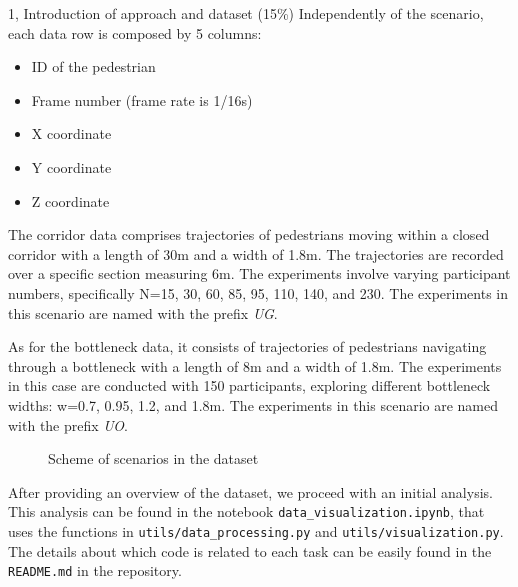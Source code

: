 \begin{task}{1, Introduction of approach and dataset (15\%)}
Independently of the scenario, each data row is composed by 5 columns:
\begin{itemize}
    \item ID of the pedestrian
    \item Frame number (frame rate is 1/16s)
    \item X coordinate
    \item Y coordinate
    \item Z coordinate
\end{itemize}

The corridor data comprises trajectories of pedestrians moving within a closed corridor with a length of 30m and a width of 1.8m. The trajectories are recorded over a specific section measuring 6m. The experiments involve varying participant numbers, specifically N=15, 30, 60, 85, 95, 110, 140, and 230. The experiments in this scenario are named with the prefix \textit{UG}.

As for the bottleneck data, it consists of trajectories of pedestrians navigating through a bottleneck with a length of 8m and a width of 1.8m. The experiments in this case are conducted with 150 participants, exploring different bottleneck widths: w=0.7, 0.95, 1.2, and 1.8m. The experiments in this scenario are named with the prefix \textit{UO}.
\begin{figure}[H]
\centering
{}
\caption{Scheme of scenarios in the dataset}
\label{scenario}
\end{figure}

After providing an overview of the dataset, we proceed with an initial analysis. This analysis can be found in the notebook \verb|data_visualization.ipynb|, that uses the functions in \verb|utils/data_processing.py| and \verb|utils/visualization.py|. The details about which code is related to each task can be easily found in the \verb|README.md| in the repository.


\end{task}

